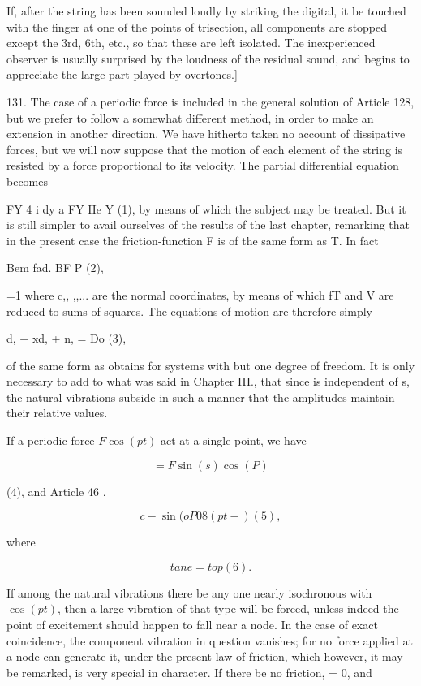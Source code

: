 If, after the string has been sounded loudly by striking the digital, it be
touched with the finger at one of the points of trisection, all components are
stopped except the 3rd, 6th, etc., so that these are left isolated. The
inexperienced observer is usually surprised by the loudness of the residual
sound, and begins to appreciate the large part played by overtones.]

131. The case of a periodic force is included in the general solution of
Article 128, but we prefer to follow a somewhat different method, in order to
make an extension in another direction. We have hitherto taken no account of
dissipative forces, but we will now suppose that the motion of each element of
the string is resisted by a force proportional to its velocity. The partial
differential equation becomes

FY 4 i dy a FY He Y (1), by means of which the subject may be treated.  But it
is still simpler to avail ourselves of the results of the last chapter,
remarking that in the present case the friction-function F is of the same form
as T. In fact

Bem fad. BF P (2),

=1 where c,, ,,... are the normal coordinates, by means of which fT and V are
reduced to sums of squares. The equations of motion are therefore simply

d, + xd, + n, = Do (3),

of the same form as obtains for systems with but one degree of freedom.  It is
only necessary to add to what was said in Chapter III., that since is
independent of s, the natural vibrations subside in such a manner that the
amplitudes maintain their relative values.

If a periodic force \(F \cos(pt)\) act at a single point, we have

\[=F \sin(s)  \cos(P)\]

(4), and Article 46 .

\[c- \sin(oP 08 (pt -) (5),\]

where

\[tan e= top (6).\]

If among the natural vibrations there be any one nearly isochronous with
\(\cos(pt)\), then a large vibration of that type will be forced, unless indeed
the point of excitement should happen to fall near a node. In the case of exact
coincidence, the component vibration in question vanishes; for no force applied
at a node can generate it, under the present law of friction, which however, it
may be remarked, is very special in character. If there be no friction, = 0,
and

